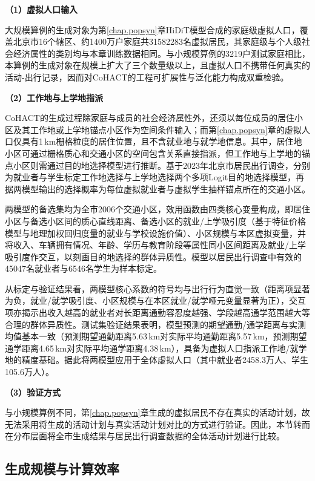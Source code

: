 \textbf{（1）虚拟人口输入}

大规模算例的生成对象为第\ref{chap.popsyn}章HiDiT模型合成的家庭级虚拟人口，覆盖北京市16个辖区、约1400万户家庭共31582283名虚拟居民，其家庭级与个人级社会经济属性的类别均与本章训练数据相同。与小规模算例的3219户测试家庭相比，本算例的生成对象在规模上扩大了三个数量级以上，且虚拟人口不携带任何真实的活动-出行记录，因而对CoHACT的工程可扩展性与泛化能力构成双重检验。

\textbf{（2）工作地与上学地指派}

CoHACT的生成过程除家庭与成员的社会经济属性外，还须以每位成员的居住小区及其工作地或上学地锚点小区作为空间条件输入；而第\ref{chap.popsyn}章的虚拟人口仅具有1\,km栅格粒度的居住位置，且不含就业地与就学地信息。其中，居住地小区可通过栅格质心和交通小区的空间包含关系直接指派，但工作地与上学地的锚点小区则需通过目的地选择模型进行推断。基于2023年北京市居民出行调查，分别为就业者与学生标定工作地选择与上学地选择两个多项Logit目的地选择模型，再据两模型输出的选择概率为每位虚拟就业者与虚拟学生抽样锚点所在的交通小区。

两模型的备选集均为全市2006个交通小区，效用函数由四类核心变量构成，即居住小区与备选小区间的质心直线距离、备选小区的就业/上学吸引度（基于特征价格模型与地理加权回归度量的就业与学校设施价值）、小区规模与本区虚拟变量，并将收入、车辆拥有情况、年龄、学历与教育阶段等属性同小区间距离及就业/上学吸引度作交互，以刻画目的地选择的群体异质性。模型以居民出行调查中有效的45047名就业者与6546名学生为样本标定。

从标定与验证结果看，两模型核心系数的符号均与出行行为直觉一致（距离项显著为负，就业/就学吸引度、小区规模与在本区就业/就学哑元变量显著为正），交互项亦揭示出收入越高的就业者对长距离通勤容忍度越强、学段越高通学范围越大等合理的群体异质性。测试集验证结果表明，模型预测的期望通勤/通学距离与实测均值基本一致（预测期望通勤距离5.63\,km对实际平均通勤距离5.57\,km，预测期望通学距离4.65\,km对实际平均通学距离4.38\,km），具备为虚拟人口指派工作地/就学地的精度基础。据此将两模型应用于全体虚拟人口（其中就业者2458.3万人、学生105.6万人）。

\textbf{（3）验证方式}

与小规模算例不同，第\ref{chap.popsyn}章生成的虚拟居民不存在真实的活动计划，故无法采用将生成的活动计划与真实活动计划对比的方式进行验证。因此，本节转而在分布层面将全市生成结果与居民出行调查数据的全体活动计划进行比较。

\subsection{生成规模与计算效率}\label{subsec.cohact.cityexp.scale}

